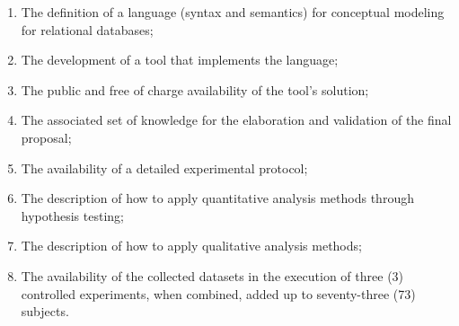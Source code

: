 
\begin{enumerate} [label=\roman*.]
    \item The definition of a language (syntax and semantics) for conceptual modeling for relational databases;
    \item The development of a tool that implements the language;
    \item The public and free of charge availability of the tool's solution;
    \item The associated set of knowledge for the elaboration and validation of the final proposal;
    \item The availability of a detailed experimental protocol;
    \item The description of how to apply quantitative analysis methods through hypothesis testing;
    \item The description of how to apply qualitative analysis methods;
    \item The availability of the collected datasets in the execution of three (3) controlled experiments, when combined, added up to seventy-three (73) subjects.
\end{enumerate}

